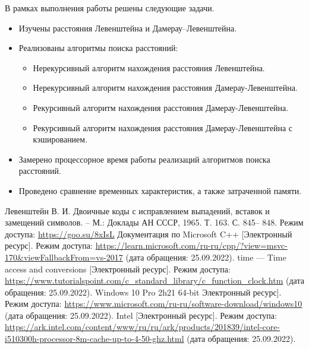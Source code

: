 \documentclass[a4paper,14pt, unknownkeysallowed]{bmstu}
\begin{document}
В рамках выполнения работы решены следующие задачи.
\begin{itemize}
	\item Изучены расстояния Левенштейна и Дамерау--Левенштейна.
	\item Реализованы алгоритмы поиска расстояний:
	\begin{itemize}
		\item Нерекурсивный алгоритм нахождения расстояния Левенштейна.
		\item Нерекурсивный алгоритм нахождения расстояния Дамерау-Левенштейна.
		\item Рекурсивный алгоритм нахождения расстояния Дамерау-Левенштейна.
		\item Рекурсивный алгоритм нахождения расстояния Дамерау-Левенштейна с кэшированием.
	\end{itemize}
	\item Замерено процессорное время работы реализаций алгоритмов поиска расстояний.
	\item Проведено сравнение временных характеристик, а также затраченной памяти.
\end{itemize}

\begin{thebibliography}{5}
	Левенштейн В. И. Двоичные коды с исправлением выпадений, вставок и замещений символов. – М.: Доклады АН СССР, 1965. Т. 163. С. 845– 848.
	Режим доступа: \url{https://goo.su/8xIsL}
    Документация по Microsoft C++ [Электронный ресурс]. Режим доступа: \url{https://learn.microsoft.com/ru-ru/cpp/?view=msvc-170&viewFallbackFrom=vs-2017} (дата обращения: 25.09.2022).
	time — Time access and conversions [Электронный ресурс]. Режим доступа: \url{https://www.tutorialspoint.com/c_standard_library/c_function_clock.htm} (дата обращения: 25.09.2022).
	Windows 10 Pro 2h21 64-bit  Электронный ресурс]. Режим доступа: \url{https://www.microsoft.com/ru-ru/software-download/windows10} (дата обращения: 25.09.2022).
	Intel [Электронный ресурс]. Режим доступа: \url{https://ark.intel.com/content/www/ru/ru/ark/products/201839/intel-core-i510300h-processor-8m-cache-up-to-4-50-ghz.html} (дата обращения: 25.09.2022).
\end{thebibliography}

\end{document}
